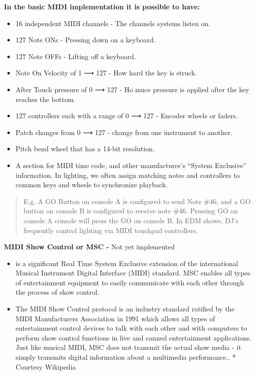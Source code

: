 \documentclass[
]{article}
\begin{document}
\textbf{In the basic MIDI implementation it is possible to have:}

\begin{itemize}
\item
  16 independent MIDI channels - The channels systems listen on.
\item
  127 Note ONs - Pressing down on a keyboard.
\item
  127 Note OFFs - Lifting off a keyboard.
\item
  Note On Velocity of 1 ⟶ 127 - How hard the key is struck.
\item
  After Touch pressure of 0 ⟶ 127 - Ho muce pressure is applied after the key reaches the bottom.
\item
  127 controllers each with a range of 0 ⟶ 127 - Encoder wheels or faders.
\item
  Patch changes from 0 ⟶ 127 - change from one instrument to another.
\item
  Pitch bend wheel that has a 14-bit resolution.
\item
  A section for MIDI time code, and other manufacturer's ``System Exclusive'' information. In lighting, we often assign matching notes and controllers to common keys and wheels to synchronize playback.
\end{itemize}

\begin{quote}
E.g. A GO Button on console A is configured to send Note \#46, and a GO button on console B is configured to receive note \#46. Pressing GO on console A console will press the GO on console B. In EDM shows, DJ's frequently control lighting via MIDI touchpad controllers.
\end{quote}

\textbf{MIDI Show Control or MSC -} {Not yet implemented}

\begin{itemize}
\item
  is a significant Real Time System Exclusive extension of the international Musical Instrument Digital Interface (MIDI) standard. MSC enables all types of entertainment equipment to easily communicate with each other through the process of show control.
\item
  The MIDI Show Control protocol is an industry standard ratified by the MIDI Manufacturers Association in 1991 which allows all types of entertainment control devices to talk with each other and with computers to perform show control functions in live and canned entertainment applications. Just like musical MIDI, MSC does not transmit the actual show media - it simply transmits digital information about a multimedia performance.. * Courtesy Wikipedia
\end{itemize}
\end{document}
